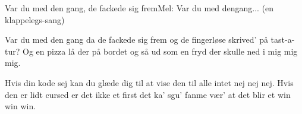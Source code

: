\begin{sang}{Var du med den gang, de fackede sig frem}{Mel: Var du med dengang... (en klappelegs-sang)}
    \begin{vers}
    Var du med den gang
    da de fackede sig frem
    og de fingerløse skrived'
    på tast-a-tur?
    Og en pizza lå
    der på bordet og så
    ud som en fryd der skulle
    ned i mig mig mig.
    \end{vers}
    \begin{vers}
    Hvis din kode sej
    kan du glæde dig
    til at vise den til alle
    intet nej nej nej.
    Hvis den er lidt cursed
    er det ikke et first
    det ka' sgu' fanme vær'
    at det blir et win win win.
    \end{vers}
\end{sang}